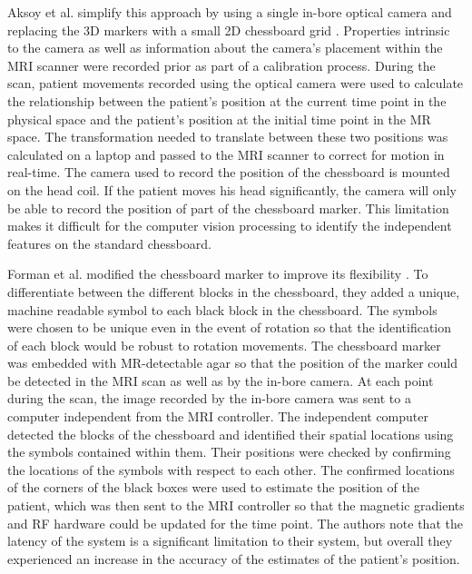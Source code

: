 Aksoy et al. simplify this approach by using a single in-bore optical camera and replacing the 3D markers with a small 2D chessboard grid \cite{Aksoy2008}. Properties intrinsic to the camera as well as information about the camera's placement within the MRI scanner were recorded prior as part of a calibration process. During the scan, patient movements recorded using the optical camera were used to calculate the relationship between the patient's position at the current time point in the physical space and the patient's position at the initial time point in the MR space. The transformation needed to translate between these two positions was calculated on a laptop and passed to the MRI scanner to correct for motion in real-time. The camera used to record the position of the chessboard is mounted on the head coil. If the patient moves his head significantly, the camera will only be able to record the position of part of the chessboard marker. This limitation makes it difficult for the computer vision processing to identify the independent features on the standard chessboard. 

Forman et al. modified the chessboard marker to improve its flexibility \cite{Forman2011}. To differentiate between the different blocks in the chessboard, they added a unique, machine readable symbol to each black block in the chessboard. The symbols were chosen to be unique even in the event of rotation so that the identification of each block would be robust to rotation movements. The chessboard marker was embedded with MR-detectable agar so that the position of the marker could be detected in the MRI scan as well as by the in-bore camera. At each point during the scan, the image recorded by the in-bore camera was sent to a computer independent from the MRI controller. The independent computer detected the blocks of the chessboard and identified their spatial locations using the symbols contained within them. Their positions were checked by confirming the locations of the symbols with respect to each other. The confirmed locations of the corners of the black boxes were used to estimate the position of the patient, which was then sent to the MRI controller so that the magnetic gradients and RF hardware could be updated for the time point. The authors note that the latency of the system is a significant limitation to their system, but overall they experienced an increase in the accuracy of the estimates of the patient's position.

